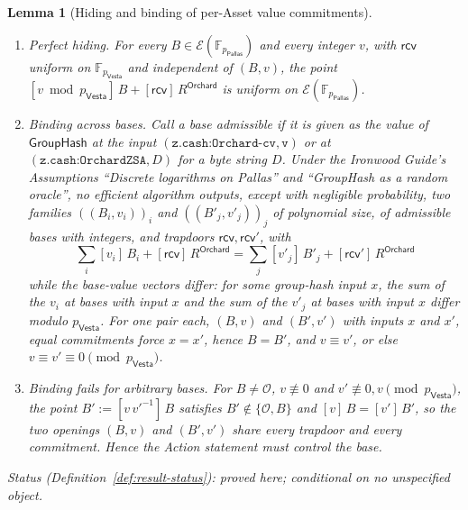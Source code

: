 \documentclass[11pt,a4paper]{article}
\newtheorem{lemma}[theorem]{Lemma}
\theoremstyle{definition}
\newcommand{\F}{\mathbb{F}}
\newcommand{\Pallas}{\ensuremath{\mathsf{Pallas}}}
\newcommand{\Vesta}{\ensuremath{\mathsf{Vesta}}}
\newcommand{\Ep}{\ensuremath{\mathcal{E}}}
\newcommand{\GroupHash}{\ensuremath{\mathsf{GroupHash}}}
\newcommand{\rcv}{\ensuremath{\mathsf{rcv}}}
\begin{document}
\begin{lemma}[Hiding and binding of per-Asset value commitments]
\label{lem:zsa-cv}
\leavevmode
\begin{enumerate}
\item[(i)] Perfect hiding. For every $B \in \Ep(\F_{p_{\Pallas}})$ and every
  integer $v$, with $\rcv$ uniform on $\F_{p_{\Vesta}}$ and independent of
  $(B, v)$, the point $[v \bmod p_{\Vesta}]\,B + [\rcv]\,R^{\mathsf{Orchard}}$
  is uniform on $\Ep(\F_{p_{\Pallas}})$.
\item[(ii)] Binding across bases. Call a base \emph{admissible} if it is
  given as the value of $\GroupHash$ at the input
  $(\texttt{z.cash:Orchard-cv}, \texttt{v})$ or at
  $(\texttt{z.cash:OrchardZSA}, D)$ for a byte string $D$. Under the
  \emph{Ironwood Guide}'s Assumptions ``Discrete logarithms on Pallas'' and
  ``GroupHash as a random oracle'', no efficient algorithm outputs, except
  with negligible probability, two families $((B_i, v_i))_i$ and
  $((B'_j, v'_j))_j$ of polynomial size, of admissible bases with integers,
  and trapdoors $\rcv, \rcv'$, with
  \[
    \textstyle\sum_i [v_i]\,B_i + [\rcv]\,R^{\mathsf{Orchard}}
    = \sum_j [v'_j]\,B'_j + [\rcv']\,R^{\mathsf{Orchard}}
  \]
  while the base-value vectors differ: for some group-hash input $x$, the
  sum of the $v_i$ at bases with input $x$ and the sum of the $v'_j$ at
  bases with input $x$ differ modulo $p_{\Vesta}$. For one pair each,
  $(B, v)$ and $(B', v')$ with inputs $x$ and $x'$, equal commitments
  force $x = x'$, hence $B = B'$, and $v \equiv v'$, or else
  $v \equiv v' \equiv 0 \pmod{p_{\Vesta}}$.
\item[(iii)] Binding fails for arbitrary bases. For $B \neq \mathcal{O}$,
  $v \not\equiv 0$ and $v' \not\equiv 0, v \pmod{p_{\Vesta}}$, the point
  $B' := [v\,v'^{-1}]\,B$ satisfies $B' \notin \{\mathcal{O}, B\}$ and
  $[v]\,B = [v']\,B'$, so the two openings $(B, v)$ and $(B', v')$ share
  every trapdoor and every commitment. Hence the Action statement must
  control the base.
\end{enumerate}
Status (Definition~\ref{def:result-status}): proved here; conditional on no
unspecified object.
\end{lemma}
\end{document}
